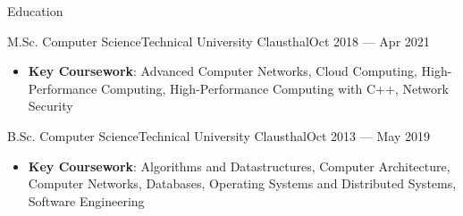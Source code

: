 \documentclass[]{mcdowellcv}
\begin{document}
\makeheader

\begin{cvsection}{Education}
\begin{cvsubsection}{M.Sc. Computer Science}{Technical University Clausthal}{Oct 2018 --- Apr 2021}
\begin{itemize}
\item \textbf{Key Coursework}: Advanced Computer Networks, Cloud Computing, High-Performance Computing, High-Performance Computing with C++, Network Security
\end{itemize}
\end{cvsubsection}
\begin{cvsubsection}{B.Sc. Computer Science}{Technical University Clausthal}{Oct 2013 --- May 2019}
\begin{itemize}
\item \textbf{Key Coursework}: Algorithms and Datastructures, Computer Architecture, Computer Networks, Databases, Operating Systems and Distributed Systems, Software Engineering
\end{itemize}
\end{cvsubsection}


\end{cvsection}
\end{document}
